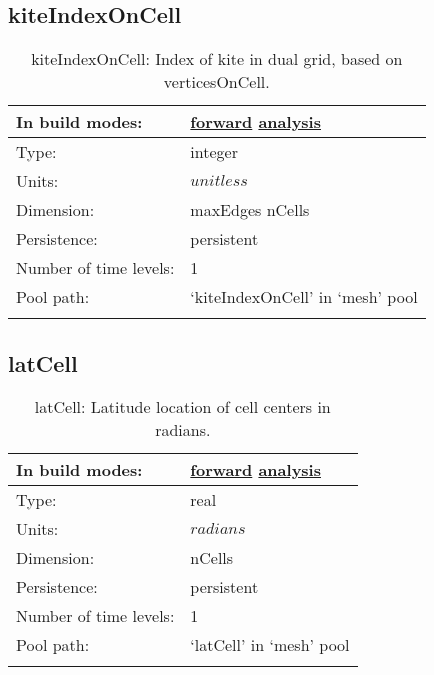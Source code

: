 \subsection[kiteIndexOnCell]{kiteIndexOnCell}
\label{subsec:var_sec_mesh_kiteIndexOnCell}
\begin{center}
\begin{longtable}{| p{2.0in} | p{4.0in} |}
        \hline 
        In build modes: & \hyperref[subsec:forward_var_tab_mesh]{forward} \hyperref[subsec:analysis_var_tab_mesh]{analysis} \\
        \hline 
        Type: & integer \\
        \hline 
        Units: & $unitless$ \\
        \hline 
        Dimension: & maxEdges nCells \\
        \hline 
        Persistence: & persistent \\
        \hline 
        Number of time levels: & 1 \\
        \hline 
            Pool path: & `kiteIndexOnCell' in `mesh' pool \\
		 \hline 
    \caption{kiteIndexOnCell: Index of kite in dual grid, based on verticesOnCell.}
\end{longtable}
\end{center}
\subsection[latCell]{latCell}
\label{subsec:var_sec_mesh_latCell}
\begin{center}
\begin{longtable}{| p{2.0in} | p{4.0in} |}
        \hline 
        In build modes: & \hyperref[subsec:forward_var_tab_mesh]{forward} \hyperref[subsec:analysis_var_tab_mesh]{analysis} \\
        \hline 
        Type: & real \\
        \hline 
        Units: & $radians$ \\
        \hline 
        Dimension: & nCells \\
        \hline 
        Persistence: & persistent \\
        \hline 
        Number of time levels: & 1 \\
        \hline 
            Pool path: & `latCell' in `mesh' pool \\
		 \hline 
    \caption{latCell: Latitude location of cell centers in radians.}
\end{longtable}
\end{center}
